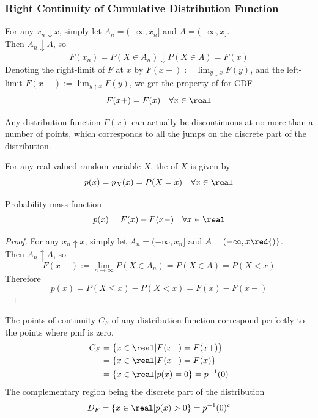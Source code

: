\documentclass[11pt]{article}
\numberwithin{equation}{section}
\begin{document}
\subsubsection{Right Continuity of Cumulative Distribution Function}
For any $x_n \downarrow x$, simply let $A_n = (-\infty, x_n]$ and $A=(-\infty, x]$. \\
Then $A_n \downarrow A$, so 
$$F(x_n) = P(X \in A_n) \downarrow P(X \in A) = F(x)$$
Denoting the right-limit of $F$ at $x$ by $F(x+) := \lim_{y\downarrow x}F(y)$, and the left-limit $F(x-) := \lim_{y\uparrow x}F(y)$, we get the property of  for CDF
\begin{equation}
	F(x+) = F(x) \quad \forall x \in \real
\end{equation}

\remark
Any distribution function $F(x)$ can actually be discontinuous at no more than a  number of points, which corresponds to all the jumps on the discrete part of the distribution.

 For any real-valued random variable $X$, the  of $X$ is given by
$$p(x) = p_X(x) = P(X=x) \quad \forall x \in \real$$

\proposition Probability mass function
\begin{equation}
	p(x) = F(x) - F(x-) \quad \forall x \in \real
\end{equation}
\begin{proof}
For any $x_n \uparrow x$, simply let $A_n = (-\infty, x_n]$ and $A=(-\infty, x\red{)}$. \\
Then $A_n \uparrow A$, so 
$$F(x-) := \lim_{n \rightarrow \infty} P(X \in A_n) = P(X \in A) = P(X < x)$$
Therefore
$$p(x) = P(X \leq x) - P(X < x) = F(x) - F(x-)$$ 
\end{proof}

\remark
The points of continuity $C_F$ of any distribution function correspond perfectly to the points where pmf is zero.
\begin{align}
	C_F &= \{ x \in \real | F(x-) = F(x+) \} \\
	&= \{ x \in \real | F(x-) = F(x) \} \\
	&= \{ x \in \real | p(x) = 0\} = p^{-1}(0)
\end{align}
The complementary region being the discrete part of the distribution
\begin{align}
	D_F = \{x \in \real | p(x) > 0\} = p^{-1}(0)^c
\end{align}
\end{document}
